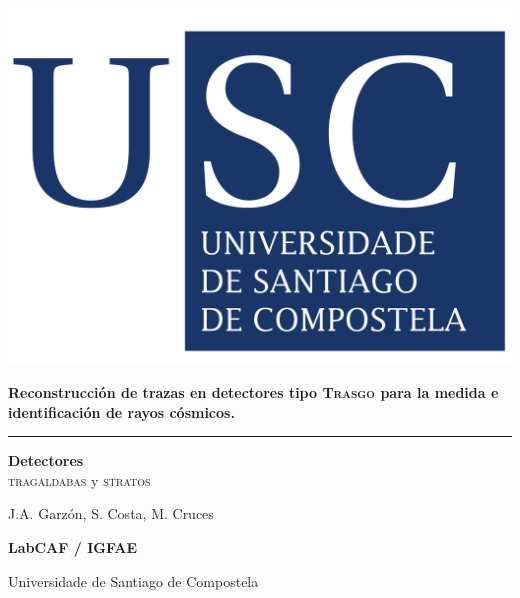 \documentclass[a4paper]{article}
\begin{document}
\begin{centering}

\begin{minipage}[c]{0.4\linewidth}
    \centering
\includegraphics[height=5\baselineskip]{LogoUSC}
\end{minipage}

	\vspace{1.5cm}
    {\huge\bfseries Reconstrucci\'on de trazas en detectores tipo \textsc{Trasgo} para la medida e identificación de rayos cósmicos.\par}
	\vspace{0.25cm}

	
	\noindent\rule{\textwidth}{1pt}
    
	\vspace{0.25cm}
{\huge \textbf{Detectores} \\ \textsc{tragaldabas} y \textsc{stratos}\par}
	
	\vspace{1cm}

    J.A. Garzón, S. Costa, M. Cruces
	
	\vspace{0.5cm}

	{\large\bfseries LabCAF / IGFAE  \par Universidade de Santiago de Compostela}

	\vspace{1cm}

\end{centering}


\end{document}

